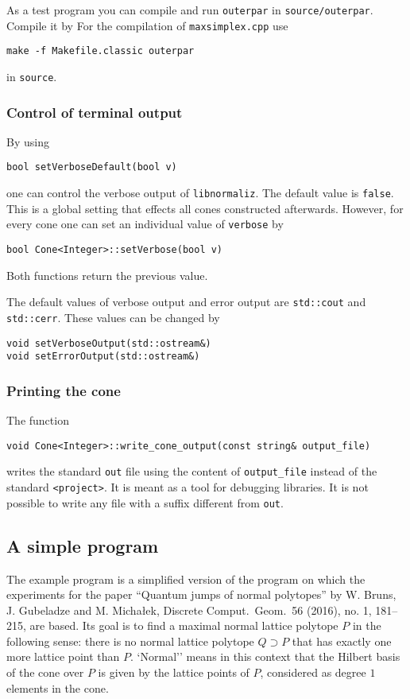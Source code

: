 \documentclass[12pt,a4paper]{scrartcl}
\theoremstyle{definition}
\begin{document}
\begin{small}
As a test program you can compile and run \verb|outerpar| in \verb|source/outerpar|. Compile it by For the compilation of \verb|maxsimplex.cpp| use
\begin{Verbatim}
make -f Makefile.classic outerpar
\end{Verbatim}
in \verb|source|.

\subsubsection{Control of terminal output}
By using
\begin{Verbatim}
bool setVerboseDefault(bool v)
\end{Verbatim}
one can control the verbose output of \verb|libnormaliz|. The default value is \verb|false|. This is a global setting that effects all cones constructed afterwards. However, for every cone one can set an individual value of \verb|verbose| by
\begin{Verbatim}
bool Cone<Integer>::setVerbose(bool v)
\end{Verbatim}
Both functions return the previous value.

The default values of verbose output and error output are \verb|std::cout| and \verb|std::cerr|. These values can be changed by
\begin{Verbatim}
void setVerboseOutput(std::ostream&)
void setErrorOutput(std::ostream&)
\end{Verbatim}

\subsubsection{Printing  the cone}

The function
\begin{Verbatim}
void Cone<Integer>::write_cone_output(const string& output_file)
\end{Verbatim}

writes the standard \verb|out| file using the content of \verb|output_file| instead of the standard \verb|<project>|. It is meant as a tool for debugging libraries. It is not possible to write any file with a suffix different from \verb|out|.

\subsection{A simple program}\label{maxsimplex}

The example program is a simplified version of the program on which the experiments for the paper ``Quantum jumps of normal polytopes'' by  W. Bruns, J. Gubeladze and M. Micha\l{}ek, Discrete Comput.\ Geom.\ 56 (2016), no. 1, 181--215, are based. Its goal is to find a maximal normal lattice polytope $P$ in the following sense: there is no normal lattice polytope $Q\supset P$ that has exactly one more lattice point than $P$. `Normal'' means in this context that the Hilbert basis of the cone over $P$ is given by the lattice points of $P$, considered as degree $1$ elements in the cone. 


\end{small}
\end{document}
